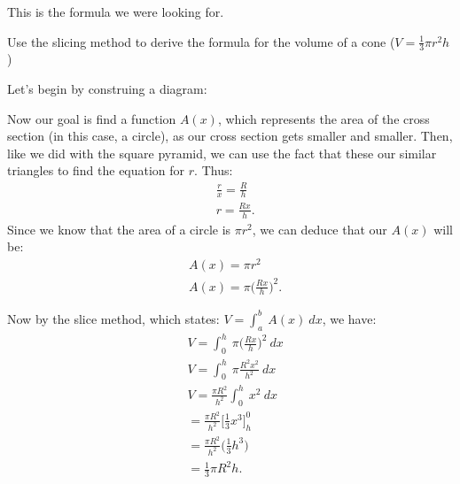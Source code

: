 \documentclass{report}
\begin{document}
    \bigbreak \noindent 
    This is the formula we were looking for.
    \pagebreak \bigbreak \noindent 
    \begin{eg}
        Use the slicing method to derive the formula for the volume of a cone ($V = \frac{1}{3}\pi r^{2}h$)
    \end{eg}
    \bigbreak \noindent 
    Let's begin by construing a diagram:
    \bigbreak \noindent 
    \begin{minipage}[]{0.47\textwidth}
    \end{minipage}
    \begin{minipage}[]{0.47\textwidth}
    Now our goal is find a function $A(x)$, which represents the area of the cross section (in this case, a circle), as our cross section gets smaller and smaller.
    Then, like we did with the square pyramid, we can use the fact that these our similar triangles to find the equation for $r$. Thus:
    \begin{align*}
        &\frac{r}{x} = \frac{R}{h} \\
        &r = \frac{Rx}{h}
    .\end{align*}
    Since we know that the area of a circle is $\pi r^{2}$, we can deduce that our $A(x)$ will be:
    \begin{align*}
        &A(x) = \pi r^{2} \\
        &A(x) = \pi \bigg(\frac{Rx}{h}\bigg)^{2}
    .\end{align*}
    \end{minipage}
    \bigbreak \noindent 
    \bigbreak \noindent 
    Now by the slice method, which states: $V  = \int_{a}^{b}\ A(x)\ dx $, we have:
    \begin{align*}
        &V = \int_{0}^{h}\ \pi \bigg(\frac{Rx}{h}\bigg)^{2}\ dx \\
        &V = \int_{0}^{h}\ \pi \frac{R^{2}x^{2}}{h^{2}}\ dx \\
        &V = \frac{\pi R^{2}}{h^{2}}\int_{0}^{h}\ x^{2}\ dx \\
        &= \frac{\pi R^{2}}{h^{2}}\bigg[\frac{1}{3}x^{3}\bigg]^{0}_{h} \\
        &= \frac{\pi R^{2}}{h^{2}}\bigg(\frac{1}{3}h^{3}\bigg) \\
        &= \frac{1}{3}\pi R^{2}h 
    .\end{align*}
\end{document}
